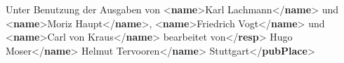\begin{shaded}
\hspace*{1em}\hspace*{1em}Unter Benutzung der Ausgaben von {<\textbf{name}>}Karl\mbox{}\newline 
\hspace*{1em}\hspace*{1em}\hspace*{1em}\hspace*{1em}\hspace*{1em}\hspace*{1em}\hspace*{1em}\hspace*{1em} Lachmann{</\textbf{name}>} und {<\textbf{name}>}Moriz Haupt{</\textbf{name}>}, {<\textbf{name}>}Friedrich\mbox{}\newline 
\hspace*{1em}\hspace*{1em}\hspace*{1em}\hspace*{1em}\hspace*{1em}\hspace*{1em}\hspace*{1em}\hspace*{1em} Vogt{</\textbf{name}>} und {<\textbf{name}>}Carl von Kraus{</\textbf{name}>} bearbeitet von{</\textbf{resp}>}\mbox{}\newline 
\hspace*{1em}\hspace*{1em}Hugo Moser{</\textbf{name}>}\mbox{}\newline 
\hspace*{1em}\hspace*{1em}Helmut Tervooren{</\textbf{name}>}\mbox{}\newline 
\hspace*{1em}\mbox{}\newline 
\hspace*{1em}\mbox{}\newline 
\hspace*{1em}\hspace*{1em}Stuttgart{</\textbf{pubPlace}>}\mbox{}\newline 

\end{shaded}
